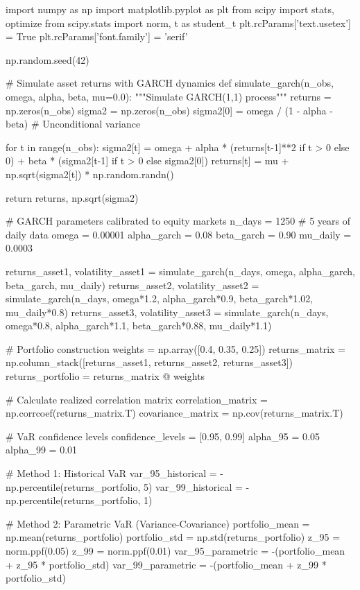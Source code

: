 \documentclass[11pt,a4paper]{article}
\begin{document}
\begin{pycode}

import numpy as np
import matplotlib.pyplot as plt
from scipy import stats, optimize
from scipy.stats import norm, t as student_t
plt.rcParams['text.usetex'] = True
plt.rcParams['font.family'] = 'serif'

np.random.seed(42)

# Simulate asset returns with GARCH dynamics
def simulate_garch(n_obs, omega, alpha, beta, mu=0.0):
    """Simulate GARCH(1,1) process"""
    returns = np.zeros(n_obs)
    sigma2 = np.zeros(n_obs)
    sigma2[0] = omega / (1 - alpha - beta)  # Unconditional variance

    for t in range(n_obs):
        sigma2[t] = omega + alpha * (returns[t-1]**2 if t > 0 else 0) + beta * (sigma2[t-1] if t > 0 else sigma2[0])
        returns[t] = mu + np.sqrt(sigma2[t]) * np.random.randn()

    return returns, np.sqrt(sigma2)

# GARCH parameters calibrated to equity markets
n_days = 1250  # 5 years of daily data
omega = 0.00001
alpha_garch = 0.08
beta_garch = 0.90
mu_daily = 0.0003

returns_asset1, volatility_asset1 = simulate_garch(n_days, omega, alpha_garch, beta_garch, mu_daily)
returns_asset2, volatility_asset2 = simulate_garch(n_days, omega*1.2, alpha_garch*0.9, beta_garch*1.02, mu_daily*0.8)
returns_asset3, volatility_asset3 = simulate_garch(n_days, omega*0.8, alpha_garch*1.1, beta_garch*0.88, mu_daily*1.1)

# Portfolio construction
weights = np.array([0.4, 0.35, 0.25])
returns_matrix = np.column_stack([returns_asset1, returns_asset2, returns_asset3])
returns_portfolio = returns_matrix @ weights

# Calculate realized correlation matrix
correlation_matrix = np.corrcoef(returns_matrix.T)
covariance_matrix = np.cov(returns_matrix.T)

# VaR confidence levels
confidence_levels = [0.95, 0.99]
alpha_95 = 0.05
alpha_99 = 0.01

# Method 1: Historical VaR
var_95_historical = -np.percentile(returns_portfolio, 5)
var_99_historical = -np.percentile(returns_portfolio, 1)

# Method 2: Parametric VaR (Variance-Covariance)
portfolio_mean = np.mean(returns_portfolio)
portfolio_std = np.std(returns_portfolio)
z_95 = norm.ppf(0.05)
z_99 = norm.ppf(0.01)
var_95_parametric = -(portfolio_mean + z_95 * portfolio_std)
var_99_parametric = -(portfolio_mean + z_99 * portfolio_std)


\end{pycode}
\end{document}
